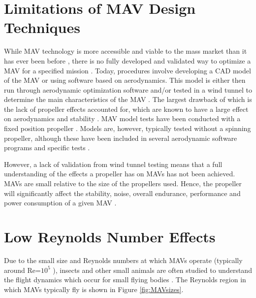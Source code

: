 
\section{Limitations of MAV Design Techniques}
\label{subsec:Limitations}
While MAV technology is more accessible and viable to the mass market than it has ever been before \cite{Jackson2016}, there is no fully developed and validated way to optimize a MAV for a specified mission \cite{Bronz2009, HASSANALIAN2019}. Today, procedures involve developing a CAD model of the MAV or using software based on aerodynamics. This model is either then run through aerodynamic optimization software and/or tested in a wind tunnel to determine the main characteristics of the MAV \cite{Paulson2017}. The largest drawback of which is the lack of propeller effects accounted for, which are known to have a large effect on aerodynamics and stability \cite{Harikumar2021, Chinwicharnam2013}. MAV model tests have been conducted with a fixed position propeller \cite{Shams2020b, Durai2014}. Models are, however, typically tested without a spinning propeller, although these have been included in several aerodynamic software programs and specific tests \cite{Aboelezz2020}. 

However, a lack of validation from wind tunnel testing means that a full understanding of the effects a propeller has on MAVs has not been achieved. MAVs are small relative to the size of the propellers used. Hence, the propeller will significantly affect the stability, noise, overall endurance, performance and power consumption of a given MAV \cite{Shams2020, Chen2022}. 



\section{Low Reynolds Number Effects }\label{sec:Reynolds2}

\label{sec:LowReynolds}
Due to the small size and Reynolds numbers at which MAVs operate (typically around Re=$10^5$ \cite{Huq2009} \cite{Winslow2018}), insects and other small animals are often studied to understand the flight dynamics which occur for small flying bodies \cite{Liu2009}. The Reynolds region in which MAVs typically fly is shown in Figure \ref{fig:MAVsizes}.

